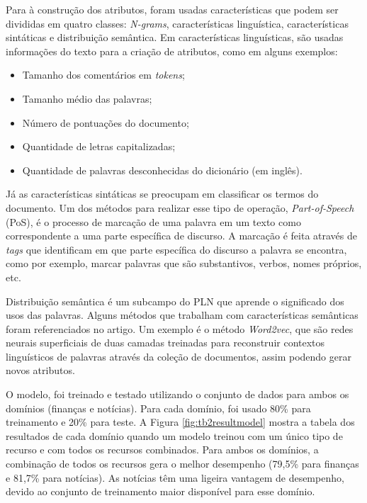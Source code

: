 Para à construção dos atributos, foram usadas características que podem ser divididas em quatro classes: \textit{N-grams}, características linguística, características sintáticas e distribuição semântica.
Em características linguísticas, são usadas informações do texto para a criação de atributos, como em alguns exemplos:
\begin{itemize}
    \item Tamanho dos comentários em {\it tokens};
    \item Tamanho médio das palavras;
    \item Número de pontuações do documento;
    \item Quantidade de letras capitalizadas;
    \item Quantidade de palavras desconhecidas do dicionário (em inglês).
\end{itemize}

\newpage
Já as características sintáticas se preocupam em classificar os termos do documento.
Um dos métodos para realizar esse tipo de operação, {\it Part-of-Speech} (PoS), é o processo de marcação de uma palavra em um texto como correspondente a uma parte específica de discurso. A marcação é feita através de {\it tags} que identificam em que parte específica do discurso a palavra se encontra, como por exemplo, marcar palavras que são substantivos, verbos, nomes próprios, etc.

Distribuição semântica é um subcampo do PLN que aprende o significado dos usos das palavras. Alguns métodos que trabalham com características semânticas foram referenciados no artigo. Um exemplo é o método \textit{Word2vec}, que são redes neurais superficiais de duas camadas  treinadas para reconstruir contextos linguísticos de palavras através da coleção de documentos, assim podendo gerar novos atributos.

O modelo, foi treinado e testado utilizando o conjunto de dados para ambos os domínios (finanças e notícias). Para cada domínio, foi usado 80\% para treinamento e 20\% para teste. A Figura \ref{fig:tb2resultmodel} mostra a tabela dos resultados de cada domínio quando um modelo treinou com um único tipo de recurso e com todos os recursos combinados. Para ambos os domínios, a combinação de todos os recursos gera o melhor desempenho (79,5\% para finanças e 81,7\% para notícias). As notícias têm uma ligeira vantagem de desempenho, devido ao conjunto de treinamento maior disponível para esse domínio.


